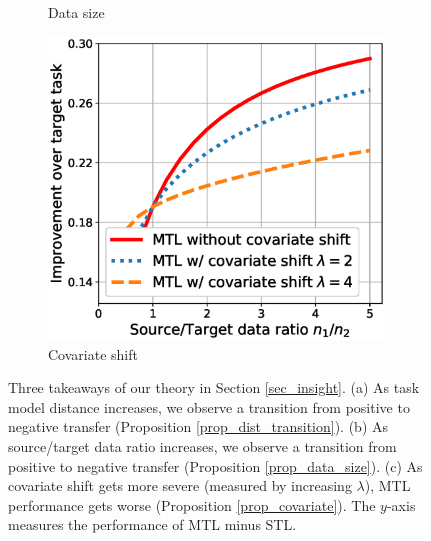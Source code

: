 \begin{figure}
\begin{subfigure}[b]{0.32\textwidth}
		\caption{Data size}
		\label{fig_size}
	\end{subfigure}\hfill
	\begin{subfigure}[b]{0.32\textwidth}
		\centering
		\includegraphics[width=0.98\textwidth]{figures/complementary.eps}
		\caption{Covariate shift}
		\label{fig_covariate}
	\end{subfigure}
	\caption{Three takeaways of our theory in Section \ref{sec_insight}.
	(a) As task model distance increases, we observe a transition from positive to negative transfer  (Proposition \ref{prop_dist_transition}).
	(b) As source/target data ratio increases, we observe a transition from positive to negative transfer (Proposition \ref{prop_data_size}).
	(c) As covariate shift gets more severe (measured by increasing $\lambda$), MTL performance gets worse (Proposition \ref{prop_covariate}).
	The $y$-axis measures the performance of MTL minus STL.}
	\label{fig_model_shift_phasetrans}
\end{figure}

